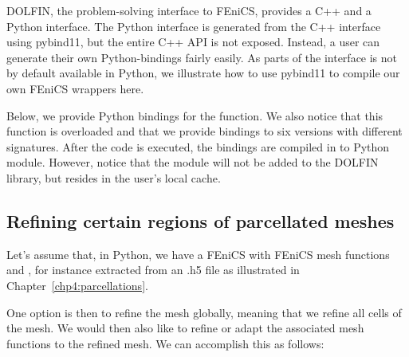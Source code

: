 DOLFIN, the problem-solving interface to FEniCS, provides a C++ and a
Python interface. The Python interface is generated from the C++
interface using pybind11, but the entire C++ API is not
exposed. Instead, a user can generate their own Python-bindings fairly
easily. As parts of the  interface is not by
default available in Python, we illustrate how to use pybind11 to
compile our own FEniCS wrappers here.

Below, we provide Python bindings for the  function. We
also notice that this function is overloaded and that we provide
bindings to six versions with different signatures. After the code is
executed, the bindings are compiled in to Python module. However,
notice that the module will not be added to the DOLFIN library, but
resides in the user's local cache.

\subsection{Refining certain regions of parcellated meshes}

Let's assume that, in Python, we have a FEniCS  with FEniCS
mesh functions  and , for instance
extracted from an .h5 file as illustrated in
Chapter~\ref{chp4:parcellations}. 

One option is then to refine the mesh globally, meaning that we refine
all cells of the mesh. We would then also like to refine or adapt the
associated mesh functions to the refined mesh. We can accomplish this
as follows:


